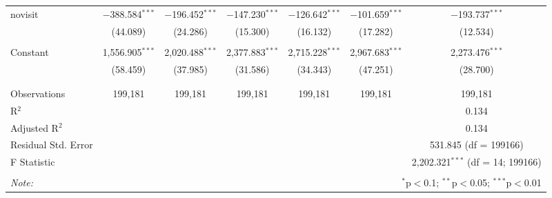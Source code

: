 \begin{table}[!htbp]
\begin{tabular}{@{\extracolsep{5pt}}lcccccc}
 novisit & $-$388.584$^{***}$ & $-$196.452$^{***}$ & $-$147.230$^{***}$ & $-$126.642$^{***}$ & $-$101.659$^{***}$ & $-$193.737$^{***}$ \\ 
  & (44.089) & (24.286) & (15.300) & (16.132) & (17.282) & (12.534) \\ 
  & & & & & & \\ 
 Constant & 1,556.905$^{***}$ & 2,020.488$^{***}$ & 2,377.883$^{***}$ & 2,715.228$^{***}$ & 2,967.683$^{***}$ & 2,273.476$^{***}$ \\ 
  & (58.459) & (37.985) & (31.586) & (34.343) & (47.251) & (28.700) \\ 
  & & & & & & \\ 
\hline \\[-1.8ex] 
Observations & 199,181 & 199,181 & 199,181 & 199,181 & 199,181 & 199,181 \\ 
R$^{2}$ &  &  &  &  &  & 0.134 \\ 
Adjusted R$^{2}$ &  &  &  &  &  & 0.134 \\ 
Residual Std. Error &  &  &  &  &  & 531.845 (df = 199166) \\ 
F Statistic &  &  &  &  &  & 2,202.321$^{***}$ (df = 14; 199166) \\ 
\hline 
\hline \\[-1.8ex] 
\textit{Note:}  & \multicolumn{6}{r}{$^{*}$p$<$0.1; $^{**}$p$<$0.05; $^{***}$p$<$0.01} \\ 
\end{tabular} 
\end{table} 
